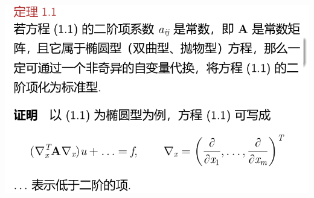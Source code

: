 \documentclass[11pt,a4paper]{ctexart}
\begin{document}
\begin{paracol}{2}
\includegraphics[width=\linewidth]{chap05_14.png}

\newpage


\end{paracol}
\end{document}
